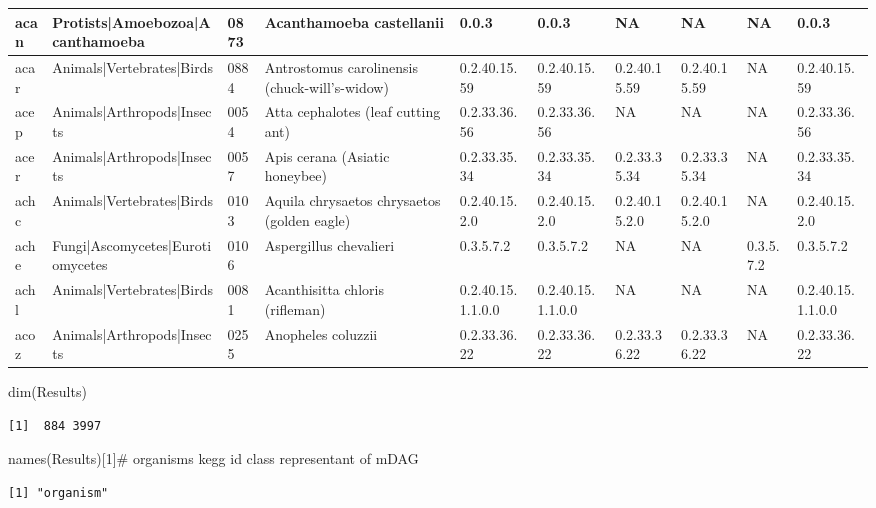 \documentclass[
  letterpaper,
  DIV=11,
  numbers=noendperiod]{scrreprt}
\newenvironment{Shaded}{\begin{snugshade}}{\end{snugshade}}
\newcommand{\CommentTok}[1]{\textcolor[rgb]{0.37,0.37,0.37}{#1}}
\newcommand{\DecValTok}[1]{\textcolor[rgb]{0.68,0.00,0.00}{#1}}
\newcommand{\FunctionTok}[1]{\textcolor[rgb]{0.28,0.35,0.67}{#1}}
\newcommand{\NormalTok}[1]{\textcolor[rgb]{0.00,0.23,0.31}{#1}}
\begin{document}
\begin{tabular}{l|l|l|l|l|l|l|l|l|l}
\hline
acan & Protists|Amoebozoa|Acanthamoeba & 0873 & Acanthamoeba castellanii & 0.0.3 & 0.0.3 & NA & NA & NA & 0.0.3\\
\hline
acar & Animals|Vertebrates|Birds & 0884 & Antrostomus carolinensis (chuck-will's-widow) & 0.2.40.15.59 & 0.2.40.15.59 & 0.2.40.15.59 & 0.2.40.15.59 & NA & 0.2.40.15.59\\
\hline
acep & Animals|Arthropods|Insects & 0054 & Atta cephalotes (leaf cutting ant) & 0.2.33.36.56 & 0.2.33.36.56 & NA & NA & NA & 0.2.33.36.56\\
\hline
acer & Animals|Arthropods|Insects & 0057 & Apis cerana (Asiatic honeybee) & 0.2.33.35.34 & 0.2.33.35.34 & 0.2.33.35.34 & 0.2.33.35.34 & NA & 0.2.33.35.34\\
\hline
achc & Animals|Vertebrates|Birds & 0103 & Aquila chrysaetos chrysaetos (golden eagle) & 0.2.40.15.2.0 & 0.2.40.15.2.0 & 0.2.40.15.2.0 & 0.2.40.15.2.0 & NA & 0.2.40.15.2.0\\
\hline
ache & Fungi|Ascomycetes|Eurotiomycetes & 0106 & Aspergillus chevalieri & 0.3.5.7.2 & 0.3.5.7.2 & NA & NA & 0.3.5.7.2 & 0.3.5.7.2\\
\hline
achl & Animals|Vertebrates|Birds & 0081 & Acanthisitta chloris (rifleman) & 0.2.40.15.1.1.0.0 & 0.2.40.15.1.1.0.0 & NA & NA & NA & 0.2.40.15.1.1.0.0\\
\hline
acoz & Animals|Arthropods|Insects & 0255 & Anopheles coluzzii & 0.2.33.36.22 & 0.2.33.36.22 & 0.2.33.36.22 & 0.2.33.36.22 & NA & 0.2.33.36.22\\
\hline
\end{tabular}

\begin{Shaded}
\begin{Highlighting}[]
\FunctionTok{dim}\NormalTok{(Results)}
\end{Highlighting}
\end{Shaded}

\begin{verbatim}
[1]  884 3997
\end{verbatim}

\begin{Shaded}
\begin{Highlighting}[]
\FunctionTok{names}\NormalTok{(Results)[}\DecValTok{1}\NormalTok{]}\CommentTok{\# organisms  kegg id  class representant of mDAG}
\end{Highlighting}
\end{Shaded}

\begin{verbatim}
[1] "organism"
\end{verbatim}
\end{document}
